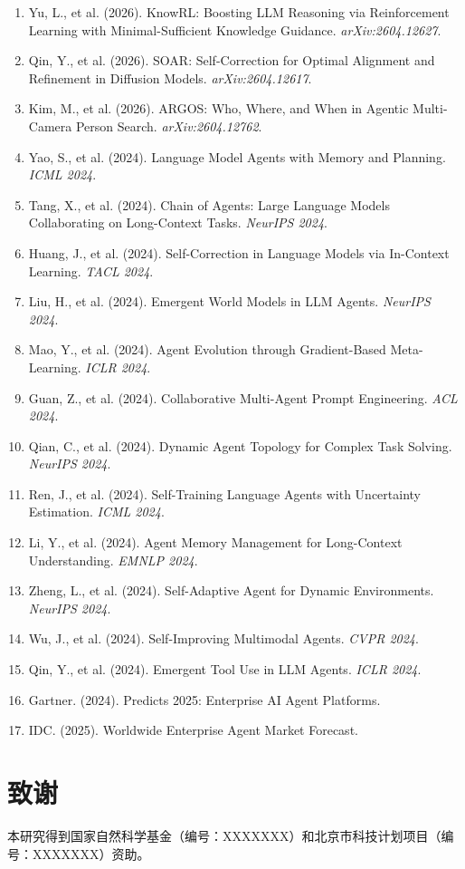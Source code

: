 \documentclass[12pt,a4paper]{article}
\begin{document}
\begin{enumerate}
    \item Yu, L., et al. (2026). KnowRL: Boosting LLM Reasoning via Reinforcement Learning with Minimal-Sufficient Knowledge Guidance. \textit{arXiv:2604.12627}.
    \item Qin, Y., et al. (2026). SOAR: Self-Correction for Optimal Alignment and Refinement in Diffusion Models. \textit{arXiv:2604.12617}.
    \item Kim, M., et al. (2026). ARGOS: Who, Where, and When in Agentic Multi-Camera Person Search. \textit{arXiv:2604.12762}.
    \item Yao, S., et al. (2024). Language Model Agents with Memory and Planning. \textit{ICML 2024}.
    \item Tang, X., et al. (2024). Chain of Agents: Large Language Models Collaborating on Long-Context Tasks. \textit{NeurIPS 2024}.
    \item Huang, J., et al. (2024). Self-Correction in Language Models via In-Context Learning. \textit{TACL 2024}.
    \item Liu, H., et al. (2024). Emergent World Models in LLM Agents. \textit{NeurIPS 2024}.
    \item Mao, Y., et al. (2024). Agent Evolution through Gradient-Based Meta-Learning. \textit{ICLR 2024}.
    \item Guan, Z., et al. (2024). Collaborative Multi-Agent Prompt Engineering. \textit{ACL 2024}.
    \item Qian, C., et al. (2024). Dynamic Agent Topology for Complex Task Solving. \textit{NeurIPS 2024}.
    \item Ren, J., et al. (2024). Self-Training Language Agents with Uncertainty Estimation. \textit{ICML 2024}.
    \item Li, Y., et al. (2024). Agent Memory Management for Long-Context Understanding. \textit{EMNLP 2024}.
    \item Zheng, L., et al. (2024). Self-Adaptive Agent for Dynamic Environments. \textit{NeurIPS 2024}.
    \item Wu, J., et al. (2024). Self-Improving Multimodal Agents. \textit{CVPR 2024}.
    \item Qin, Y., et al. (2024). Emergent Tool Use in LLM Agents. \textit{ICLR 2024}.
    \item Gartner. (2024). Predicts 2025: Enterprise AI Agent Platforms.
    \item IDC. (2025). Worldwide Enterprise Agent Market Forecast.
\end{enumerate}

\section*{致谢}

本研究得到国家自然科学基金（编号：XXXXXXX）和北京市科技计划项目（编号：XXXXXXX）资助。
\end{document}
